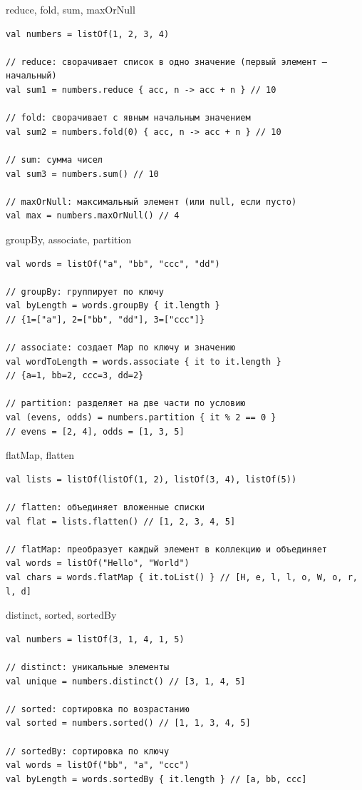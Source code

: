 \documentclass[aspectratio=169]{beamer}
\begin{document}
\begin{frame}[fragile]{reduce, fold, sum, maxOrNull}
\lstset{language=Kotlin}
\begin{lstlisting}
val numbers = listOf(1, 2, 3, 4)

// reduce: сворачивает список в одно значение (первый элемент — начальный)
val sum1 = numbers.reduce { acc, n -> acc + n } // 10

// fold: сворачивает с явным начальным значением
val sum2 = numbers.fold(0) { acc, n -> acc + n } // 10

// sum: сумма чисел
val sum3 = numbers.sum() // 10

// maxOrNull: максимальный элемент (или null, если пусто)
val max = numbers.maxOrNull() // 4
\end{lstlisting}
\end{frame}

\begin{frame}[fragile]{groupBy, associate, partition}
\lstset{language=Kotlin}
\begin{lstlisting}
val words = listOf("a", "bb", "ccc", "dd")

// groupBy: группирует по ключу
val byLength = words.groupBy { it.length }
// {1=["a"], 2=["bb", "dd"], 3=["ccc"]}

// associate: создает Map по ключу и значению
val wordToLength = words.associate { it to it.length }
// {a=1, bb=2, ccc=3, dd=2}

// partition: разделяет на две части по условию
val (evens, odds) = numbers.partition { it % 2 == 0 }
// evens = [2, 4], odds = [1, 3, 5]
\end{lstlisting}
\end{frame}

\begin{frame}[fragile]{flatMap, flatten}
\lstset{language=Kotlin}
\begin{lstlisting}
val lists = listOf(listOf(1, 2), listOf(3, 4), listOf(5))

// flatten: объединяет вложенные списки
val flat = lists.flatten() // [1, 2, 3, 4, 5]

// flatMap: преобразует каждый элемент в коллекцию и объединяет
val words = listOf("Hello", "World")
val chars = words.flatMap { it.toList() } // [H, e, l, l, o, W, o, r, l, d]
\end{lstlisting}
\end{frame}

\begin{frame}[fragile]{distinct, sorted, sortedBy}
\lstset{language=Kotlin}
\begin{lstlisting}
val numbers = listOf(3, 1, 4, 1, 5)

// distinct: уникальные элементы
val unique = numbers.distinct() // [3, 1, 4, 5]

// sorted: сортировка по возрастанию
val sorted = numbers.sorted() // [1, 1, 3, 4, 5]

// sortedBy: сортировка по ключу
val words = listOf("bb", "a", "ccc")
val byLength = words.sortedBy { it.length } // [a, bb, ccc]
\end{lstlisting}
\end{frame}
\end{document}
